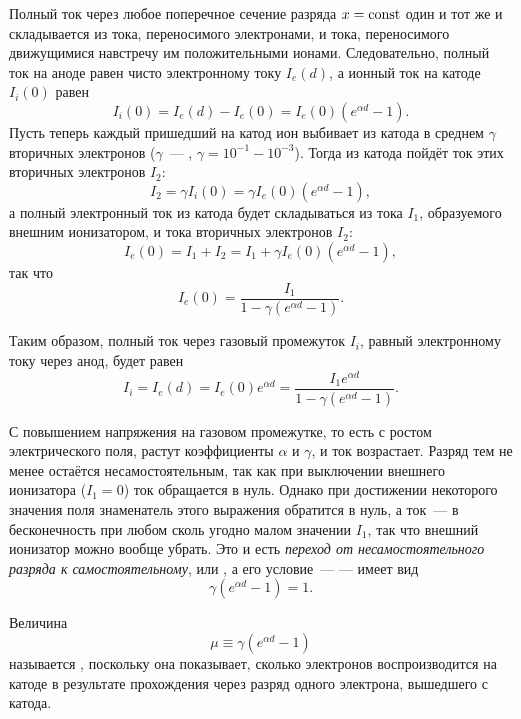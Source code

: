 Полный ток через любое поперечное сечение разряда $x=\mathrm{const}$ один и тот же и
складывается из тока, переносимого
электронами, и тока, переносимого движущимися навстречу им положительными
ионами. Следовательно, полный ток на аноде
равен чисто электронному току $I_e(d)$, а ионный ток на катоде $I_i(0)$ равен
\begin{equation*}
	I_i(0)=I_e(d)-I_e(0)=I_e(0)(e^{\alpha d}-1).
\end{equation*}
Пусть теперь каждый пришедший на катод ион выбивает из катода в среднем
$\gamma$     вторичных электронов
($\gamma$~--- ,
$\gamma=10^{-1}-10^{-3}$). Тогда из катода пойдёт ток этих вторичных
электронов $I_2$:
\begin{equation*}
	I_2=\gamma I_i(0)=\gamma I_e(0)(e^{\alpha d}-1),
\end{equation*}
а полный электронный ток из катода будет складываться из тока $I_1$, образуемого
внешним ионизатором, и тока вторичных
электронов $I_2$:
\begin{equation*}
	I_e(0)=I_1+I_2=I_1+\gamma I_e(0)(e^{\alpha d}-1),
\end{equation*}
так что
\begin{equation*}
	I_e(0)=\frac{I_1}{1-\gamma(e^{\alpha d}-1)}.
\end{equation*}

Таким образом, полный ток через газовый промежуток $I_i$, равный электронному
току через анод, будет равен
\begin{equation*}
	I_i=I_e(d)=I_e(0)e^{\alpha d}=\frac{I_1e^{\alpha d}}{1-\gamma(e^{\alpha
d}-1)}.
\end{equation*}

С повышением напряжения на газовом промежутке, то есть с ростом электрического
поля, растут коэффициенты $\alpha$ и
$\gamma$, и ток возрастает. Разряд тем не менее остаётся несамостоятельным, так
как при выключении внешнего ионизатора
($I_1=0$) ток обращается в нуль. Однако при достижении некоторого значения поля
знаменатель этого выражения обратится в
нуль, а ток~--- в бесконечность при любом сколь угодно малом значении $I_1$, так
что внешний ионизатор можно вообще
убрать. Это и есть \emph{переход от несамостоятельного разряда к
самостоятельному}, или , а его
условие~---  --- имеет вид
\begin{equation}
	\gamma(e^{\alpha d}-1)=1.
\end{equation}

Величина
\begin{equation*}
	\mu\equiv\gamma(e^{\alpha d}-1)
\end{equation*}
называется , поскольку она показывает,
сколько электронов воспроизводится на катоде в
результате прохождения через разряд одного электрона, вышедшего с катода.

